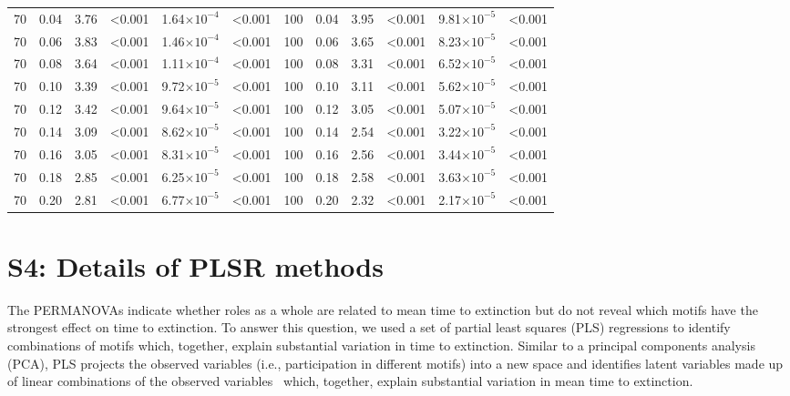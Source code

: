 \documentclass[12pt]{article}
\begin{document}
\begin{table}[h!]
\begin{tabular}{c c | c c| c c ||c c | c c | c c |}
	        70	&	0.04	&	3.76	&	\textless0.001	&	1.64$\times10^{-4}$	&	\textless0.001	&	100	&	0.04	&	3.95	&	\textless0.001	&	9.81$\times10^{-5}$	&	\textless0.001	\\
	        70	&	0.06	&	3.83	&	\textless0.001	&	1.46$\times10^{-4}$	&	\textless0.001	&	100	&	0.06	&	3.65	&	\textless0.001	&	8.23$\times10^{-5}$	&	\textless0.001	\\
	        70	&	0.08	&	3.64	&	\textless0.001	&	1.11$\times10^{-4}$	&	\textless0.001	&	100	&	0.08	&	3.31	&	\textless0.001	&	6.52$\times10^{-5}$	&	\textless0.001	\\
	        70	&	0.10	&	3.39	&	\textless0.001	&	9.72$\times10^{-5}$	&	\textless0.001	&	100	&	0.10	&	3.11	&	\textless0.001	&	5.62$\times10^{-5}$	&	\textless0.001	\\
	        70	&	0.12	&	3.42	&	\textless0.001	&	9.64$\times10^{-5}$	&	\textless0.001	&	100	&	0.12	&	3.05	&	\textless0.001	&	5.07$\times10^{-5}$	&	\textless0.001	\\
	        70	&	0.14	&	3.09	&	\textless0.001	&	8.62$\times10^{-5}$	&	\textless0.001	&	100	&	0.14	&	2.54	&	\textless0.001	&	3.22$\times10^{-5}$	&	\textless0.001	\\
	        70	&	0.16	&	3.05	&	\textless0.001	&	8.31$\times10^{-5}$	&	\textless0.001	&	100	&	0.16	&	2.56	&	\textless0.001	&	3.44$\times10^{-5}$	&	\textless0.001	\\
	        70	&	0.18	&	2.85	&	\textless0.001	&	6.25$\times10^{-5}$	&	\textless0.001	&	100	&	0.18	&	2.58	&	\textless0.001	&	3.63$\times10^{-5}$	&	\textless0.001	\\
	        70	&	0.20	&	2.81	&	\textless0.001	&	6.77$\times10^{-5}$	&	\textless0.001	&	100	&	0.20	&	2.32	&	\textless0.001	&	2.17$\times10^{-5}$	&	\textless0.001	\\

	    \end{tabular}
	    \end{table}
    
\clearpage

\section*{S4: Details of PLSR methods}

	The PERMANOVAs indicate whether roles as a whole are related to mean time to extinction but do not reveal which motifs have the strongest effect on time to extinction.
	To answer this question, we used a set of partial least squares (PLS) regressions to identify combinations of motifs which, together, explain substantial variation in time to extinction. 
	Similar to a principal components analysis (PCA), PLS projects the observed variables (i.e., participation in different motifs) into a new space and identifies latent variables made up of linear combinations of the observed variables~\citep{Mevik2004,pls} which, together, explain substantial variation in mean time to extinction.
	
\end{document}
